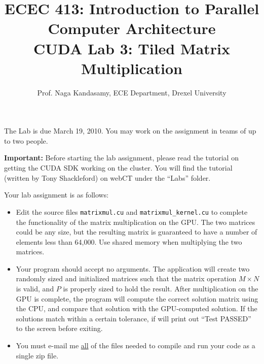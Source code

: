 \documentclass[11.5pt]{article}
\begin{document}
\newcommand{\captionfonts}{\bf}{\small}
\makeatletter  %
\long\def\@makecaption#1#2{%
  \vskip\abovecaptionskip
  \sbox\@tempboxa{{\captionfonts #1: #2}}%
  \ifdim \wd\@tempboxa >\hsize
    {\captionfonts #1: #2\par}
  \else
    \hbox to\hsize{\hfil\box\@tempboxa\hfil}%
  \fi
  \vskip\belowcaptionskip}
\makeatother   %
\renewcommand{\figurename}{Fig.} %

\title{ECEC 413: Introduction to Parallel Computer Architecture \\ CUDA Lab 3: Tiled Matrix Multiplication}
\author{Prof. Naga Kandasamy, ECE Department, Drexel University}
\maketitle %
\date{}

\noindent The Lab is due March 19, 2010. You may work on the assignment in teams of up to two people.
\vspace{12pt}

\noindent \textbf{Important:} Before starting the lab assignment, please read the tutorial on getting the CUDA SDK working on the cluster. You will find the tutorial (written by Tony Shackleford) on webCT under the ``Labs'' folder. \vspace{24pt}

\noindent Your lab assignment is as follows:
\begin{itemize}
\item Edit the source files \texttt{matrixmul.cu} and \texttt{matrixmul\_kernel.cu} to complete the functionality of the matrix multiplication on the GPU. The two matrices could be any size, but the resulting matrix is guaranteed to have a number of elements less than 64,000. Use shared memory when multiplying the two matrices.

\item Your program should accept no arguments. The application will create two randomly sized and initialized matrices such that the matrix operation $M \times N$ is valid, and $P$ is properly sized to hold the result.  After multiplication on the GPU is complete, the program will compute the correct solution matrix using the CPU, and compare that solution with the GPU-computed solution.  If the solutions match within a certain tolerance, if will print out ``Test PASSED'' to the screen before exiting.

\item You must e-mail me \underline{all} of the files needed to compile and run your code as a single zip file.
\end{itemize}
\vspace{12pt}
\end{document}
